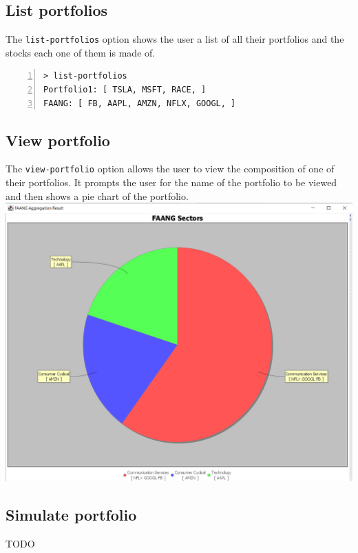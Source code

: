\subsection{List portfolios}
The \texttt{list-portfolios} option shows the user a list of all their portfolios and the stocks each one of them is made of.\\

\begin{lstlisting}[basicstyle=\footnotesize\ttfamily,language={},numbers=left,keepspaces=true,tabsize=4,
numberstyle=\footnotesize,numbersep=8pt,frame=single]
> list-portfolios
Portfolio1: [ TSLA, MSFT, RACE, ]
FAANG: [ FB, AAPL, AMZN, NFLX, GOOGL, ]
\end{lstlisting}

\subsection{View portfolio}
The \texttt{view-portfolio} option allows the user to view the composition of one of their portfolios. It prompts the user for the name of the portfolio to be viewed and then shows a pie chart of the portfolio.\\

{\centering
\includegraphics[scale=0.32]{img/user_manual/view_portfolio.png}\\
}

\subsection{Simulate portfolio}
TODO

